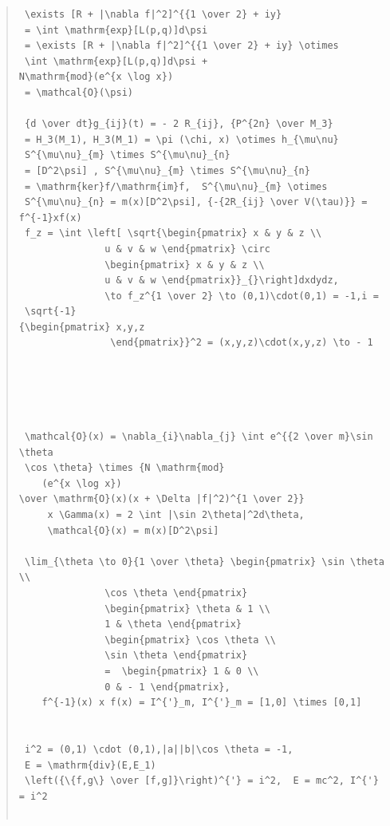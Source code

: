 \documentclass{jsarticle}
\begin{document}
\begin{quote}
\begin{verbatim}
 \exists [R + |\nabla f|^2]^{{1 \over 2} + iy} 
 = \int \mathrm{exp}[L(p,q)]d\psi 
 = \exists [R + |\nabla f|^2]^{{1 \over 2} + iy} \otimes 
 \int \mathrm{exp}[L(p,q)]d\psi +
N\mathrm{mod}(e^{x \log x}) 
 = \mathcal{O}(\psi) 

 {d \over dt}g_{ij}(t) = - 2 R_{ij}, {P^{2n} \over M_3} 
 = H_3(M_1), H_3(M_1) = \pi (\chi, x) \otimes h_{\mu\nu} 
 S^{\mu\nu}_{m} \times S^{\mu\nu}_{n}
 = [D^2\psi] , S^{\mu\nu}_{m} \times S^{\mu\nu}_{n}
 = \mathrm{ker}f/\mathrm{im}f,  S^{\mu\nu}_{m} \otimes 
 S^{\mu\nu}_{n} = m(x)[D^2\psi], {-{2R_{ij} \over V(\tau)}} = f^{-1}xf(x) 
 f_z = \int \left[ \sqrt{\begin{pmatrix} x & y & z \\
			   u & v & w \end{pmatrix} \circ 
			   \begin{pmatrix} x & y & z \\
			   u & v & w \end{pmatrix}}_{}\right]dxdydz, 
			   \to f_z^{1 \over 2} \to (0,1)\cdot(0,1) = -1,i = 
 \sqrt{-1} 
{\begin{pmatrix} x,y,z
			    \end{pmatrix}}^2 = (x,y,z)\cdot(x,y,z) \to - 1 

			  



 \mathcal{O}(x) = \nabla_{i}\nabla_{j} \int e^{{2 \over m}\sin \theta
 \cos \theta} \times {N \mathrm{mod}
	(e^{x \log x})
\over \mathrm{O}(x)(x + \Delta |f|^2)^{1 \over 2}} 
	 x \Gamma(x) = 2 \int |\sin 2\theta|^2d\theta, 
	 \mathcal{O}(x) = m(x)[D^2\psi] 
	
 \lim_{\theta \to 0}{1 \over \theta} \begin{pmatrix} \sin \theta \\
			   \cos \theta \end{pmatrix} 
			   \begin{pmatrix} \theta & 1 \\
			   1 & \theta \end{pmatrix} 
			   \begin{pmatrix} \cos \theta \\
			   \sin \theta \end{pmatrix}
			   =  \begin{pmatrix} 1 & 0 \\
			   0 & - 1 \end{pmatrix}, 
	f^{-1}(x) x f(x) = I^{'}_m, I^{'}_m = [1,0] \times [0,1] 


 i^2 = (0,1) \cdot (0,1),|a||b|\cos \theta = -1, 
 E = \mathrm{div}(E,E_1) 
 \left({\{f,g\} \over [f,g]}\right)^{'} = i^2,  E = mc^2, I^{'} = i^2 


\end{verbatim}
\end{quote}
\end{document}
